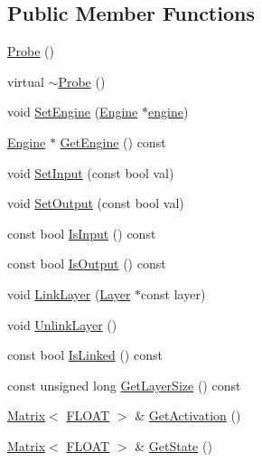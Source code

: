 \subsection*{Public Member Functions}
\begin{DoxyCompactItemize}
\item 
\hyperlink{classfractal_1_1Probe_ae6f922ee5d4b5fbb050b0ff7e62f3584}{Probe} ()
\item 
virtual \hyperlink{classfractal_1_1Probe_ab17d168b158187ba42171551da0beb2e}{$\sim$\+Probe} ()
\item 
void \hyperlink{classfractal_1_1Probe_ab861ab7eb2377dda2c4f71f9d89de44c}{Set\+Engine} (\hyperlink{classfractal_1_1Engine}{Engine} $\ast$\hyperlink{classfractal_1_1Probe_a20487048a2d0f3e33eb4a53dac23dd22}{engine})
\item 
\hyperlink{classfractal_1_1Engine}{Engine} $\ast$ \hyperlink{classfractal_1_1Probe_a179259d205501a3a4cbcdaca68e9a1c9}{Get\+Engine} () const 
\item 
void \hyperlink{classfractal_1_1Probe_ae686d6bf13bd20fb3d92a0adc95f11f7}{Set\+Input} (const bool val)
\item 
void \hyperlink{classfractal_1_1Probe_aef282d33b0695e0b813fe6e2cd4c50ce}{Set\+Output} (const bool val)
\item 
const bool \hyperlink{classfractal_1_1Probe_a3e7f32bf6372d20f9235c9094fa82ab5}{Is\+Input} () const 
\item 
const bool \hyperlink{classfractal_1_1Probe_a93e07e319ac45653b129e627ff4f2174}{Is\+Output} () const 
\item 
void \hyperlink{classfractal_1_1Probe_a83518ea7168658d8a9dd58f6a6ac1019}{Link\+Layer} (\hyperlink{classfractal_1_1Layer}{Layer} $\ast$const layer)
\item 
void \hyperlink{classfractal_1_1Probe_a6919b6dea4da1b6945dfca5194adaa3d}{Unlink\+Layer} ()
\item 
const bool \hyperlink{classfractal_1_1Probe_a8abda82903370ff19b8afa122d4091b5}{Is\+Linked} () const 
\item 
const unsigned long \hyperlink{classfractal_1_1Probe_a015e5e7f7535d4f67b3e191bea7cb42f}{Get\+Layer\+Size} () const 
\item 
\hyperlink{classfractal_1_1Matrix}{Matrix}$<$ \hyperlink{namespacefractal_a1c2d2530689575d5ccb56bae52af70d3}{F\+L\+O\+A\+T} $>$ \& \hyperlink{classfractal_1_1Probe_aad059792f9676c8141d3aa88022763f1}{Get\+Activation} ()
\item 
\hyperlink{classfractal_1_1Matrix}{Matrix}$<$ \hyperlink{namespacefractal_a1c2d2530689575d5ccb56bae52af70d3}{F\+L\+O\+A\+T} $>$ \& \hyperlink{classfractal_1_1Probe_a20b9a33116f00cdd56d3ae0fa8c7635c}{Get\+State} ()

\end{DoxyCompactItemize}
